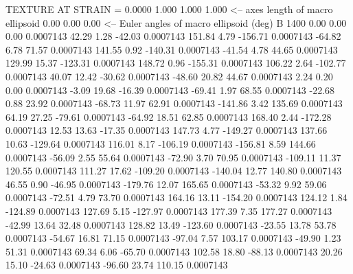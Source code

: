 TEXTURE AT STRAIN =    0.0000
   1.000   1.000   1.000  <-- axes length of macro ellipsoid
    0.00    0.00    0.00  <-- Euler angles of macro ellipsoid (deg)
B      1400
        0.00        0.00        0.00     0.0007143
       42.29        1.28      -42.03     0.0007143
      151.84        4.79     -156.71     0.0007143
      -64.82        6.78       71.57     0.0007143
      141.55        0.92     -140.31     0.0007143
      -41.54        4.78       44.65     0.0007143
      129.99       15.37     -123.31     0.0007143
      148.72        0.96     -155.31     0.0007143
      106.22        2.64     -102.77     0.0007143
       40.07       12.42      -30.62     0.0007143
      -48.60       20.82       44.67     0.0007143
        2.24        0.20        0.00     0.0007143
       -3.09       19.68      -16.39     0.0007143
      -69.41        1.97       68.55     0.0007143
      -22.68        0.88       23.92     0.0007143
      -68.73       11.97       62.91     0.0007143
     -141.86        3.42      135.69     0.0007143
       64.19       27.25      -79.61     0.0007143
      -64.92       18.51       62.85     0.0007143
      168.40        2.44     -172.28     0.0007143
       12.53       13.63      -17.35     0.0007143
      147.73        4.77     -149.27     0.0007143
      137.66       10.63     -129.64     0.0007143
      116.01        8.17     -106.19     0.0007143
     -156.81        8.59      144.66     0.0007143
      -56.09        2.55       55.64     0.0007143
      -72.90        3.70       70.95     0.0007143
     -109.11       11.37      120.55     0.0007143
      111.27       17.62     -109.20     0.0007143
     -140.04       12.77      140.80     0.0007143
       46.55        0.90      -46.95     0.0007143
     -179.76       12.07      165.65     0.0007143
      -53.32        9.92       59.06     0.0007143
      -72.51        4.79       73.70     0.0007143
      164.16       13.11     -154.20     0.0007143
      124.12        1.84     -124.89     0.0007143
      127.69        5.15     -127.97     0.0007143
      177.39        7.35      177.27     0.0007143
      -42.99       13.64       32.48     0.0007143
      128.82       13.49     -123.60     0.0007143
      -23.55       13.78       53.78     0.0007143
      -54.67       16.81       71.15     0.0007143
      -97.04        7.57      103.17     0.0007143
      -49.90        1.23       51.31     0.0007143
       69.34        6.06      -65.70     0.0007143
      102.58       18.80      -88.13     0.0007143
       20.26       15.10      -24.63     0.0007143
      -96.60       23.74      110.15     0.0007143

